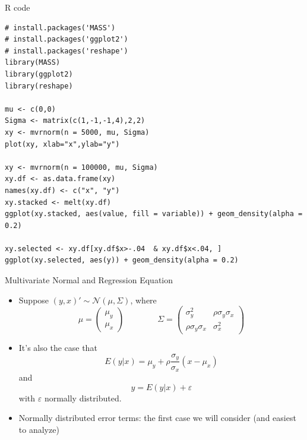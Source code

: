 

\begin{frame}[fragile]{ R code}
\begin{lstlisting}
# install.packages('MASS')
# install.packages('ggplot2')
# install.packages('reshape')
library(MASS)
library(ggplot2)
library(reshape)

mu <- c(0,0)
Sigma <- matrix(c(1,-1,-1,4),2,2)
xy <- mvrnorm(n = 5000, mu, Sigma)
plot(xy, xlab="x",ylab="y")

xy <- mvrnorm(n = 100000, mu, Sigma)
xy.df <- as.data.frame(xy)
names(xy.df) <- c("x", "y")
xy.stacked <- melt(xy.df)
ggplot(xy.stacked, aes(value, fill = variable)) + geom_density(alpha = 0.2)

xy.selected <- xy.df[xy.df$x>-.04  & xy.df$x<.04, ]
ggplot(xy.selected, aes(y)) + geom_density(alpha = 0.2)
\end{lstlisting}
\end{frame}


\begin{frame}{Multivariate Normal and Regression Equation}
\begin{itemize}

	\item Suppose $\left(y,x\right)' \sim \mathcal{N}\left(\mu,\Sigma\right)$, where \[
\mu=\left(\begin{array}{c}
\mu_{y}\\
\mu_{x}
\end{array}\right)\qquad\qquad\Sigma=\left(\begin{array}{cc}
\sigma_{y}^{2} & \rho\sigma_{y}\sigma_{x}\\
\rho\sigma_{y}\sigma_{x} & \sigma_{x}^{2}
\end{array}\right)
\]

	\smallskip
	\item It's also the case that \[
		E\left(y|x\right) = \mu_y + \rho\frac{\sigma_y}{\sigma_x}\left(x-\mu_x\right)
	\]
	and \[
		y = E\left(y|x\right) + \varepsilon
	\]
	with $\varepsilon$ normally distributed.

	\smallskip
	\item Normally distributed error terms: the first case we will consider (and easiest to analyze)

\end{itemize}
\end{frame}


